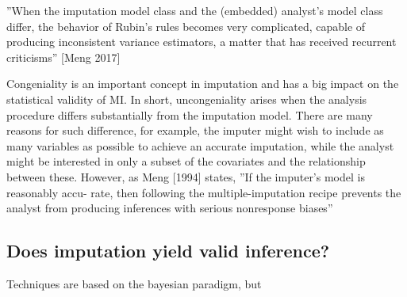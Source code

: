 \documentclass{article}
\begin{document}
	
	''When the imputation model class and the (embedded) analyst’s model class
	differ, the behavior of Rubin’s rules becomes very complicated, capable of producing inconsistent variance estimators, a matter that has received recurrent
	criticisms'' [Meng 2017]
	
	Congeniality is an important concept in imputation and has a big impact on the statistical validity of MI. In short, uncongeniality arises when the analysis procedure differs substantially from the imputation model. There are many reasons for such difference, for example, the imputer might wish to include as many variables as possible to achieve an accurate imputation, while the analyst might be interested in only a subset of the covariates and the relationship between these. However, as Meng [1994] states, ''If the imputer's model is reasonably accu-
	rate, then following the multiple-imputation recipe
	prevents the analyst from producing inferences with
	serious nonresponse biases''
	
	
	
	\subsection{Does imputation yield valid inference?}
	Techniques are based on the bayesian paradigm, but 
	
\end{document}

